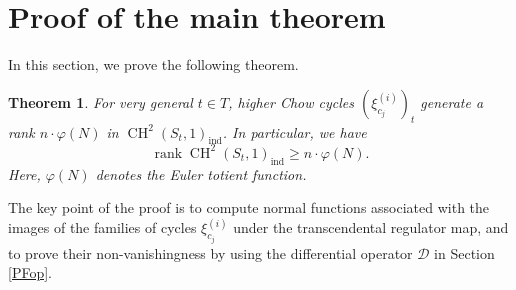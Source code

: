 \documentclass[letterpaper, 11pt]{amsart}
\theoremstyle{my theoremstyle}
\newtheorem{thm}{Theorem}[section]
\theoremstyle{dfn}
\theoremstyle{remark}
\renewcommand{\1}{\mathbbm{1}}
\newcommand{\ch}{\operatorname{CH}}
\numberwithin{equation}{section}
\begin{document}
\section{Proof of the main theorem} \label{mainproof}
In this section, we prove the following theorem.
\begin{thm}\label{mainthm}
For very general $t\in T$, higher Chow cycles $(\xi_{c_j}^{(i)})_t$ generate a rank $n\cdot\varphi(N)$ in $\ch^2(S_t,1)_{\mathrm{ind}}$.
In particular, we have
\begin{equation*}
\operatorname{rank}\ch^2(S_t,1)_{\mathrm{ind}} \ge n\cdot \varphi(N).
\end{equation*}
Here, $\varphi(N)$ denotes the Euler totient function.
\end{thm}

The key point of the proof is to compute normal functions associated with the images of the families of cycles $\xi_{c_j}^{(i)}$ under the transcendental regulator map, and to prove their non-vanishingness by using the differential operator $\mathscr{D}$ in Section \ref{PFop}.
\end{document}
